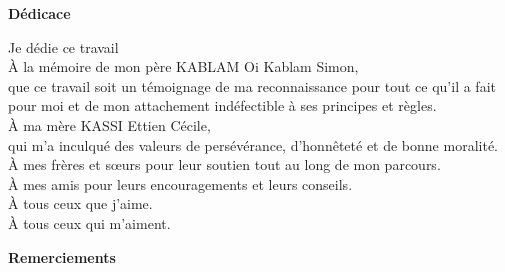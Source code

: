 \begin{center}
	\LARGE{\textbf{Dédicace}}
\end{center}

\begin{center}
	Je dédie ce travail\\
	\uppercase{à} la mémoire de mon père KABLAM Oi Kablam Simon, \\ que ce travail soit un témoignage de ma reconnaissance pour tout ce qu'il a fait pour moi et de mon attachement indéfectible à ses principes et règles. \\
	\uppercase{à} ma mère KASSI Ettien Cécile, \\ qui m'a inculqué des valeurs de persévérance, d'honnêteté et de bonne moralité. \\
	\uppercase{à} mes frères et sœurs pour leur soutien tout au long de mon parcours.\\
	\uppercase{à} mes amis pour leurs encouragements et leurs conseils.\\
	\uppercase{à} tous ceux que j'aime.\\
	\uppercase{à} tous ceux qui m'aiment.
	
	
\end{center} 

\newpage
{}
\begin{center}
	\LARGE{\textbf{Remerciements}}
\end{center}

